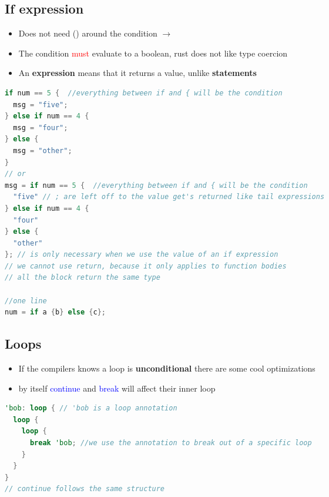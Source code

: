 \documentclass{report}
\begin{document}
\begin{multicols*}{2}
\subsection{If expression}%
\label{sub:If expression}

\begin{itemize}
  \item Does not need () around the condition $\rightarrow$ 
  \item The condition \textcolor{red}{must} evaluate to a boolean, rust does not like type coercion 
  \item An \textbf{expression} means that it returns a value, unlike \textbf{statements} 
\end{itemize}

\begin{tcolorbox}[title=If,colback=backcolour,size=small,left=4mm]
\begin{lstlisting}[language=rust]
if num == 5 {  //everything between if and { will be the condition
  msg = "five";
} else if num == 4 {
  msg = "four";
} else {
  msg = "other";
}
// or
msg = if num == 5 {  //everything between if and { will be the condition
  "five" // ; are left off to the value get's returned like tail expressions
} else if num == 4 {
  "four"
} else {
  "other"
}; // is only necessary when we use the value of an if expression
// we cannot use return, because it only applies to function bodies
// all the block return the same type

//one line
num = if a {b} else {c};
\end{lstlisting}
\end{tcolorbox}

\subsection{Loops}%
\label{sub:Loops}

\begin{itemize}
  \item If the compilers knows a loop is \textbf{unconditional} there are some cool optimizations 
  \item by itself \textcolor{blue}{continue} and \textcolor{blue}{break} will affect their inner loop
\end{itemize}

\begin{tcolorbox}[title=Unconditional Loop,colback=backcolour,size=small,left=4mm]
\begin{lstlisting}[language=rust]
'bob: loop { // 'bob is a loop annotation
  loop {
    loop {
      break 'bob; //we use the annotation to break out of a specific loop
    }
  }
}
// continue follows the same structure
\end{lstlisting}
\end{tcolorbox}


\end{multicols*}
\end{document}
